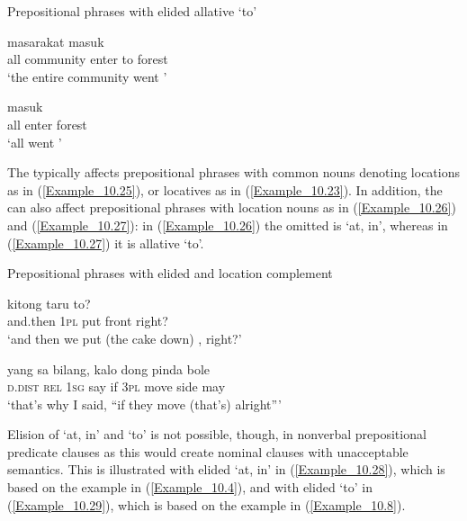 \begin{styleExampleTitle}
Prepositional phrases with elided allative  ‘to’
\end{styleExampleTitle}

\ea
\label{Example_10.24}
 {masarakat} {masuk} {} {}\\ %
 all  community  enter  to  forest\\
\glt 
‘the entire community went ’ \textstyleExampleSource{[081029-005-Cv.0012]}
\z

\ea
\label{Example_10.25}
 {masuk} {} {}\\ %
 all  enter {}   forest\\
\glt 
‘all went ’ \textstyleExampleSource{[081029-005-Cv.0111]}
\z


The  typically affects prepositional phrases with common nouns denoting locations as in (\ref{Example_10.25}), or locatives as in (\ref{Example_10.23}). In addition, the  can also affect prepositional phrases with location nouns as in (\ref{Example_10.26}) and (\ref{Example_10.27}): in (\ref{Example_10.26}) the omitted  is   ‘at, in’, whereas in (\ref{Example_10.27}) it is allative  ‘to’.


\begin{styleExampleTitle}
Prepositional phrases with elided  and location  complement
\end{styleExampleTitle}

\ea
\label{Example_10.26}
 {kitong} {taru} {} {} {to?}\\ %
 and.then  \textsc{1pl}  put  {}  front  right?\\
\glt 
‘and then we put (the cake down) , right?’ \textstyleExampleSource{[081011-005-Cv.0031]}
\z

\ea
\label{Example_10.27}
 {yang} {sa} {bilang,} {kalo} {dong} {pinda} {} {} {bole}\\ %
 \textsc{d.dist}  \textsc{rel}  \textsc{1sg}  say  if  \textsc{3pl}  move {}   side  may\\
\glt 
‘that’s why I said, ``if they move  (that’s) alright''' \textstyleExampleSource{[081011-001-Cv.0144]}
\z


Elision of  ‘at, in’ and  ‘to’ is not possible, though, in nonverbal prepositional predicate clauses as this would create nominal clauses with unacceptable semantics. This is illustrated with elided  ‘at, in’ in (\ref{Example_10.28}), which is based on the example in (\ref{Example_10.4}), and with elided  ‘to’ in (\ref{Example_10.29}), which is based on the example in (\ref{Example_10.8}).


